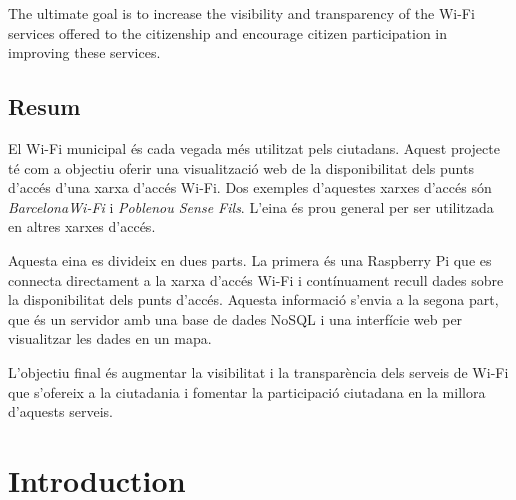 \documentclass[12pt, a4paper,twoside]{tesi_upf}
\begin{document}
The ultimate goal is to increase the visibility and transparency of the Wi-Fi services offered to the citizenship and encourage citizen participation in improving these services.

\vspace*{\fill}
\section*{\Large \sffamily  Resum}

El Wi-Fi municipal és cada vegada més utilitzat pels ciutadans. 
Aquest projecte té com a objectiu oferir una visualització web de la disponibilitat dels punts d'accés d'una xarxa d'accés Wi-Fi. Dos exemples d'aquestes xarxes d'accés són \emph{BarcelonaWi-Fi} i \emph{Poblenou Sense Fils}. L'eina és prou general per ser utilitzada en altres xarxes d'accés. 

Aquesta eina es divideix en dues parts. La primera és una Raspberry Pi que es connecta directament a la xarxa d'accés Wi-Fi i contínuament recull dades sobre la disponibilitat dels punts d'accés. Aquesta informació s'envia a la segona part, que és un servidor amb una base de dades NoSQL i una interfície web per visualitzar les dades en un mapa. 

L'objectiu final és augmentar la visibilitat i la transparència dels serveis de Wi-Fi que s'ofereix a la ciutadania i fomentar la participació ciutadana en la millora d'aquests serveis.


\vspace*{\fill}

\cleardoublepage

%


\tableofcontents

\listoffigures

\listoftables


\mainmatter
\chapter{Introduction}
\label{Chapter1}
\end{document}

